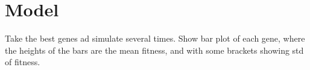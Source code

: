 
\chapter{Model} %

\label{chapter:model} %
	

Take the best genes ad simulate several times. Show bar plot of each gene, where the heights of the bars are the mean fitness, and with some brackets showing std of fitness.
